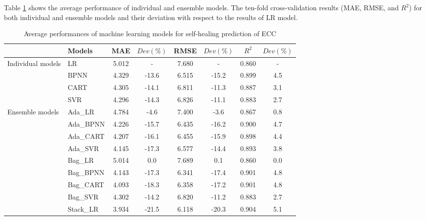 \documentclass[11pt]{article}
\begin{document}
	Table \ref{per} shows the average performance of individual and ensemble models. The ten-fold cross-validation results (MAE, RMSE, and $R^2$) for both individual and ensemble models and their deviation with respect to the results of LR model. 
		\begin{table}[!h]
		\small
		\centering
		\caption{Average performances of machine learning models for self-healing prediction of ECC}
		\begin{tabular*}{0.75\textwidth}{ll|cc|cc|cc}
			\toprule
			&	Models	&	MAE	&	$Dev(\%)$	&	RMSE	&	$Dev(\%)$	&	$R^2$	&	$Dev(\%)$	\\
			\midrule
			\multirow{4}{0.55in}{Individual models} &	LR	&	5.012	&	-	&	7.680	&	-	&	0.860	&	-	\\
			
			&	BPNN	&	4.329	&	-13.6	&	6.515	&	-15.2	&	0.899	&	4.5	\\
			
			&	CART	&	4.305	&	-14.1	&	6.811	&	-11.3	&	0.887	&	3.1	\\
			
			&	SVR	&	4.296	&	-14.3	&	6.826	&	-11.1	&	0.883	&	2.7	\\
			
			\midrule
			\multirow{10}{0.55in}{Ensemble models} 	&	Ada\_LR	&	4.784	&	-4.6	&	7.400	&	-3.6	&	0.867	&	0.8	\\
			
			&	Ada\_BPNN	&	4.226	&	-15.7	&	6.435	&	-16.2	&	0.900	&	4.7	\\
			
			&	Ada\_CART	&	4.207	&	-16.1	&	6.455	&	-15.9	&	0.898	&	4.4	\\
			
			&	Ada\_SVR	&	4.145	&	-17.3	&	6.577	&	-14.4	&	0.893	&	3.8	\\
			
			&	Bag\_LR	&	5.014	&	0.0	&	7.689	&	0.1	&	0.860	&	0.0	\\
			
			&	Bag\_BPNN	&	4.143	&	-17.3	&	6.341	&	-17.4	&	0.901	&	4.8	\\
			
			&	Bag\_CART	&	4.093	&	-18.3	&	6.358	&	-17.2	&	0.901	&	4.8	\\
			
			&	Bag\_SVR	&	4.302	&	-14.2	&	6.820	&	-11.2	&	0.883	&	2.7	\\
			
			&	Stack\_LR	&	3.934	&	-21.5	&	6.118	&	-20.3	&	0.904	&	5.1	\\
			\bottomrule
		\end{tabular*}
		\label{per}
	\end{table} 
	
\end{document}
